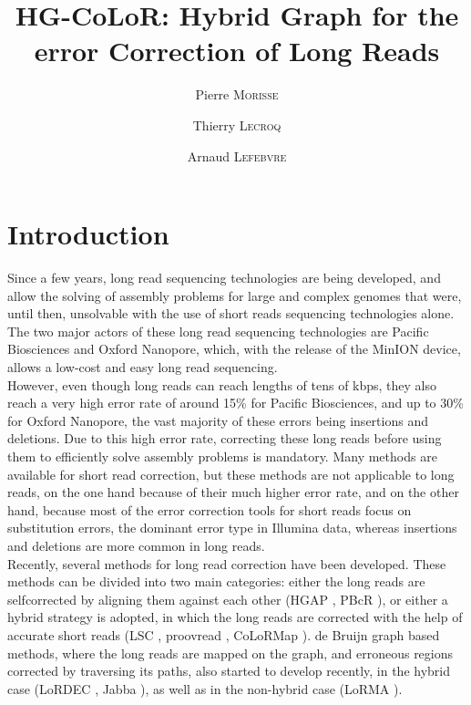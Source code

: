 \documentclass[long, final]{jobim2017}
\title{HG-CoLoR: Hybrid Graph for the error Correction of Long Reads}
\author{Pierre \textsc{Morisse} \and Thierry \textsc{Lecroq} \and Arnaud \textsc{Lefebvre}}
\institute{
 Normandie-Université, UNIROUEN, LITIS EA4108, 76821, Mt-St-Aignan, France
}
\begin{document}

\maketitle

\section{Introduction}
\label{sec:introduction}

Since a few years, long read sequencing technologies are being developed, and allow the solving of assembly problems for large and complex genomes that were, until then, unsolvable with the use of short reads sequencing technologies alone. The two major actors of these long
read sequencing technologies are Pacific Biosciences and Oxford Nanopore, which, with the release of the MinION device, allows a low-cost and easy long read sequencing. \\
\indent However, even though long reads can reach lengths of tens of kbps, they also reach a very high error rate of around 15\% for Pacific Biosciences, and up to 30\% for Oxford Nanopore, the vast majority of these errors being insertions and deletions. Due to this high error rate, correcting these long reads before using them to efficiently solve assembly problems is mandatory. Many methods are available for short read correction, but these methods are not applicable to long reads, on the one hand because of their much higher error rate, and on the other hand, because most of the error correction tools for short reads focus on substitution errors, the dominant error type in Illumina data, whereas insertions and deletions are more common in long reads. \\
\indent Recently, several methods for long read correction have been developed. These methods can be divided into two main categories: either
the long reads are selfcorrected by aligning them against each other (HGAP \cite{Chin2013}, PBcR \cite{Berlin2015}), or either a hybrid strategy is adopted, in which the long reads are corrected with the help of accurate short reads (LSC \cite{Au2012}, proovread \cite{Hackl2014}, CoLoRMap \cite{Haghshenas2016}). de Bruijn graph \cite{deBruijn1946} based methods, where the long reads are mapped on the graph, and erroneous regions corrected by traversing its paths, also started to develop recently, in the hybrid case (LoRDEC \cite{Salmela2014}, Jabba \cite{Miclotte2016}), as well as in the non-hybrid case (LoRMA \cite{Salmela2016}). \\
\end{document}
